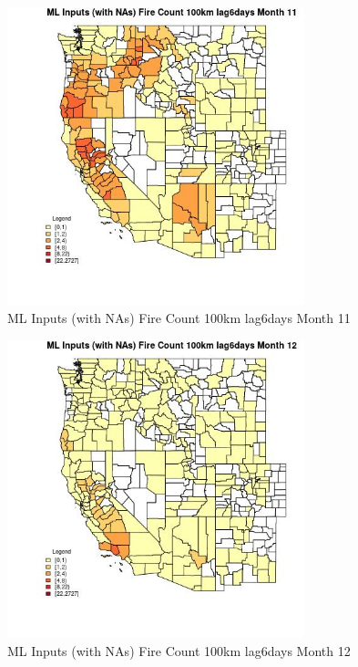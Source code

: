 \begin{figure} 
\centering  
\includegraphics[width=0.77\textwidth]{Code_Outputs/Report_ML_input_PM25_Step4_part_f_de_duplicated_aves_prioritize_24hr_obswNAs_CountyFire_Count_100km_lag6daysmedianMonth11.jpg} 
\caption{\label{fig:Report_ML_input_PM25_Step4_part_f_de_duplicated_aves_prioritize_24hr_obswNAsCountyFire_Count_100km_lag6daysmedianMonth11}ML Inputs (with NAs) Fire Count 100km lag6days Month 11} 
\end{figure} 
 

\begin{figure} 
\centering  
\includegraphics[width=0.77\textwidth]{Code_Outputs/Report_ML_input_PM25_Step4_part_f_de_duplicated_aves_prioritize_24hr_obswNAs_CountyFire_Count_100km_lag6daysmedianMonth12.jpg} 
\caption{\label{fig:Report_ML_input_PM25_Step4_part_f_de_duplicated_aves_prioritize_24hr_obswNAsCountyFire_Count_100km_lag6daysmedianMonth12}ML Inputs (with NAs) Fire Count 100km lag6days Month 12} 
\end{figure} 
 

